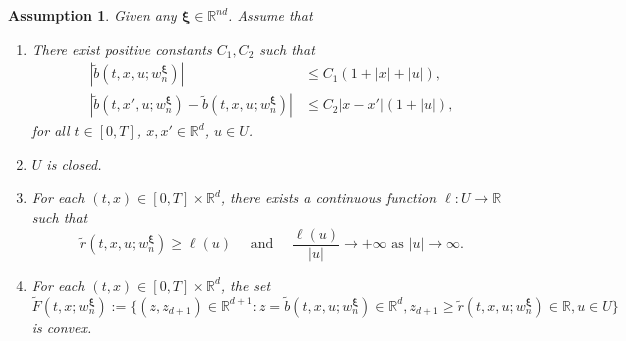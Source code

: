 \documentclass[10pt,a4paper]{amsart}
\newtheorem{assumption}{Assumption}
\newcommand{\R}{\mathbb{R}}
\begin{document}
\begin{assumption} \label{assu:existence}
    Given any $\bm{\xi} \in \R^{nd}$. Assume that 
    \begin{enumerate}
        \item There exist positive constants $C_1, C_2$ such that 
        \begin{equation*}
            \begin{aligned}
                |\tilde{b}(t,x,u;w_n^{\bm{\xi}})| &\le C_1 (1 +|x| +|u|), \\
                |\tilde{b}(t,x',u;w_n^{\bm{\xi}}) - \tilde{b}(t,x,u;w_n^{\bm{\xi}})| &\le C_2|x-x'|(1 + |u|), 
            \end{aligned}
        \end{equation*}
        for all $t\in [0,T]$, $x, x'\in \R^d$, $u\in U$. 
        \item $U$ is closed. 
        \item For each $(t,x)\in [0,T]\times \R^d$, there exists a continuous function $\ell:U\to \R$ such that 
        \begin{equation*}
            \tilde{r}(t,x,u;w_n^{\bm{\xi}}) \ge \ell(u) \quad \text{ and }\quad \frac{\ell(u)}{|u|} \to +\infty \text{ as } |u|\to \infty. 
        \end{equation*}
        \item For each $(t,x)\in [0,T]\times \R^d$, the set 
        \begin{equation*}
            \tilde{F}(t,x;w_n^{\bm{\xi}}) := \{(z,z_{d+1})\in \R^{d+1}: z=\tilde{b}(t,x,u;w_n^{\bm{\xi}})\in \R^d, z_{d+1} \ge \tilde{r}(t,x,u;w_n^{\bm{\xi}})\in \R, u\in U\}
        \end{equation*}
        is convex. 
    \end{enumerate}
\end{assumption}
\end{document}
